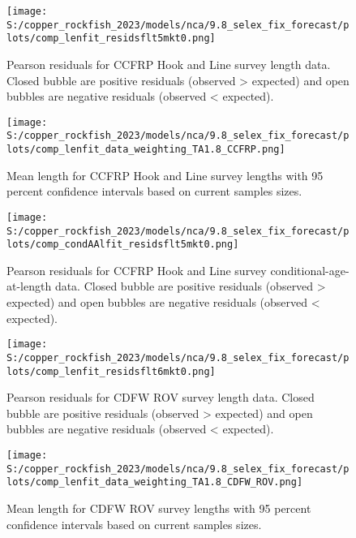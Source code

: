 \documentclass[11pt,
  english,
  letterpaper,
]{article}
\begin{document}
\begin{figure}
\centering
\texttt{[image: S:/copper\_rockfish\_2023/models/nca/9.8\_selex\_fix\_forecast/plots/comp\_lenfit\_residsflt5mkt0.png]}
\caption{Pearson residuals for CCFRP Hook and Line survey length data. Closed bubble are positive residuals (observed \textgreater{} expected) and open bubbles are negative residuals (observed \textless{} expected).\label{fig:ccfrp-len-pearson}}
\end{figure}

\pagebreak

\begin{figure}
\centering
\texttt{[image: S:/copper\_rockfish\_2023/models/nca/9.8\_selex\_fix\_forecast/plots/comp\_lenfit\_data\_weighting\_TA1.8\_CCFRP.png]}
\caption{Mean length for CCFRP Hook and Line survey lengths with 95 percent confidence intervals based on current samples sizes.\label{fig:ccfrp-mean-len-fit}}
\end{figure}

\pagebreak

\begin{figure}
\centering
\texttt{[image: S:/copper\_rockfish\_2023/models/nca/9.8\_selex\_fix\_forecast/plots/comp\_condAAlfit\_residsflt5mkt0.png]}
\caption{Pearson residuals for CCFRP Hook and Line survey conditional-age-at-length data. Closed bubble are positive residuals (observed \textgreater{} expected) and open bubbles are negative residuals (observed \textless{} expected).\label{fig:ccfrp-age-pearson}}
\end{figure}

\pagebreak

\begin{figure}
\centering
\texttt{[image: S:/copper\_rockfish\_2023/models/nca/9.8\_selex\_fix\_forecast/plots/comp\_lenfit\_residsflt6mkt0.png]}
\caption{Pearson residuals for CDFW ROV survey length data. Closed bubble are positive residuals (observed \textgreater{} expected) and open bubbles are negative residuals (observed \textless{} expected).\label{fig:rov-pearson}}
\end{figure}

\pagebreak

\begin{figure}
\centering
\texttt{[image: S:/copper\_rockfish\_2023/models/nca/9.8\_selex\_fix\_forecast/plots/comp\_lenfit\_data\_weighting\_TA1.8\_CDFW\_ROV.png]}
\caption{Mean length for CDFW ROV survey lengths with 95 percent confidence intervals based on current samples sizes.\label{fig:rov-mean-len-fit}}
\end{figure}
\end{document}
